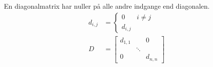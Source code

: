 
En diagonalmatrix har nuller på alle andre indgange end diagonalen. 
\begin{align*}
	d_{i,j} &= \begin{cases}
		0 			& i \not= j \\
		d_{i,j}
	\end{cases} \\
	D &= \begin{bmatrix}
		d_{1,1} & 		 & 0 \\
				& \ddots & \\
		   0    &        & d_{n,n}
	\end{bmatrix}
\end{align*}
